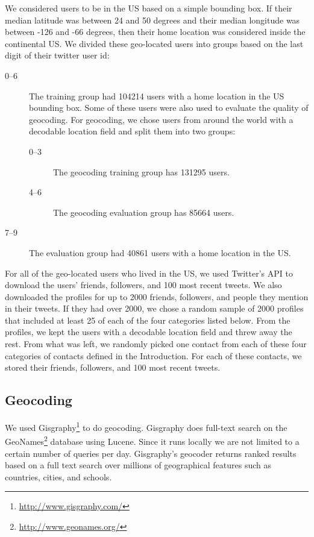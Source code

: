 \documentclass{sig-alternate}
\begin{document}
We considered users to be in the US based on a simple bounding box.  If their median latitude was between 24 and 50 degrees and their median longitude was between -126 and -66 degrees, then their home location was considered inside the continental US.
We divided these geo-located users into groups based on the last digit of their twitter user id:
\begin{description}
\item[0--6] The training group had 104214 users with a home location in the US bounding box. Some of these users were also used to evaluate the quality of geocoding. For geocoding, we chose users from around the world with a decodable location field and split them into two groups:
\begin{description}
\item[0--3] The geocoding training group has 131295 users.
\item[4--6] The geocoding evaluation group has 85664 users.
\end{description}
\item[7--9] The evaluation group had 40861 users with a home location in the US.
\end{description}

For all of the geo-located users who lived in the US, we used Twitter's API to download the users' friends, followers, and 100 most recent tweets.
We also downloaded the profiles for up to 2000 friends, followers, and people they mention in their tweets. If they had over 2000, we chose a random sample of 2000 profiles that included at least 25 of each of the four categories listed below.
From the profiles, we kept the users with a decodable location field and threw away the rest. From what was left, we randomly picked one contact from each of these four categories of contacts defined in the Introduction.
For each of these contacts, we stored their friends, followers, and 100 most recent tweets.

\subsection{Geocoding}
We used Gisgraphy\footnote{\url{http://www.gisgraphy.com/}} to do geocoding.
Gisgraphy does full-text search on the GeoNames\footnote{\url{http://www.geonames.org/}}
database using Lucene. Since
it runs locally we are not limited to a certain number of queries per day.
Gisgraphy's geocoder returns ranked results based on a full text search
over millions of geographical features such as countries, cities, and schools. 
\end{document}
